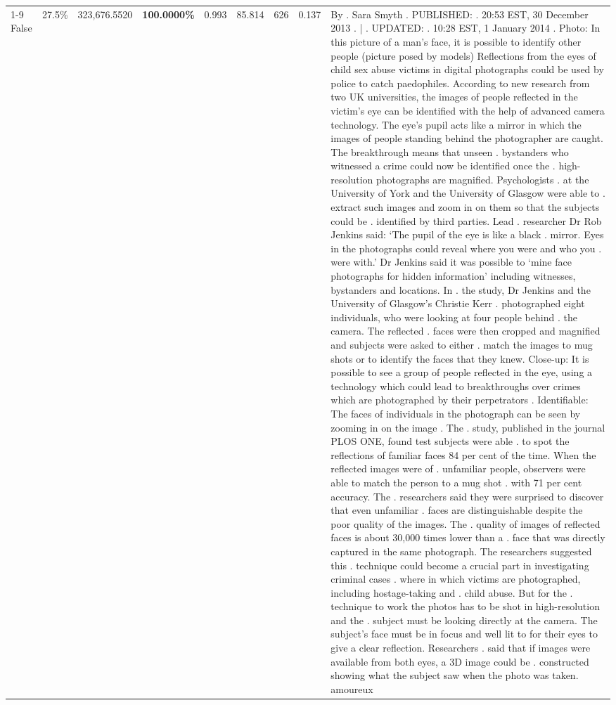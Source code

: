\begin{table}[H]
\begin{tabular}{lllrlllll}
\cline{1-9} \cline{2-9}
False & 27.5\% & 323,676.5520 & \bfseries \color{red} 100.0000\% & 0.993 & 85.814 & 626 & 0.137 & By . Sara Smyth . PUBLISHED: . 20:53 EST, 30 December 2013 . | . UPDATED: . 10:28 EST, 1 January 2014 . Photo: In this picture of a man's face, it is possible to identify other people (picture posed by models) Reflections from the eyes of child sex abuse victims in digital photographs could be used by police to catch paedophiles. According to new research from two UK universities, the images of people reflected in the victim's eye can be identified with the help of advanced camera technology. The eye's pupil acts like a mirror in which the images of people standing behind the photographer are caught. The breakthrough means that unseen . bystanders who witnessed a crime could now be identified once the . high-resolution photographs are magnified. Psychologists . at the University of York and the University of Glasgow were able to . extract such images and zoom in on them so that the subjects could be . identified by third parties. Lead . researcher Dr Rob Jenkins said: ‘The pupil of the eye is like a black . mirror. Eyes in the photographs could reveal where you were and who you . were with.' Dr Jenkins said it was possible to ‘mine face photographs for hidden information' including witnesses, bystanders and locations. In . the study, Dr Jenkins and the University of Glasgow's Christie Kerr . photographed eight individuals, who were looking at four people behind . the camera. The reflected . faces were then cropped and magnified and subjects were asked to either . match the images to mug shots or to identify the faces that they knew. Close-up: It is possible to see a group of people reflected in the eye, using a technology which could lead to breakthroughs over crimes which are photographed by their perpetrators . Identifiable: The faces of individuals in the photograph can be seen by zooming in on the image . The . study, published in the journal PLOS ONE, found test subjects were able . to spot the reflections of familiar faces 84 per cent of the time. When the reflected images were of . unfamiliar people, observers were able to match the person to a mug shot . with 71 per cent accuracy. The . researchers said they were surprised to discover that even unfamiliar . faces are distinguishable despite the poor quality of the images. The . quality of images of reflected faces is about 30,000 times lower than a . face that was directly captured in the same photograph. The researchers suggested this . technique could become a crucial part in investigating criminal cases . where in which victims are photographed, including hostage-taking and . child abuse. But for the . technique to work the photos has to be shot in high-resolution and the . subject must be looking directly at the camera. The subject's face must be in focus and well lit to for their eyes to give a clear reflection. Researchers . said that if images were available from both eyes, a 3D image could be . constructed showing what the subject saw when the photo was taken. amoureux \\

\end{tabular}
\end{table}
